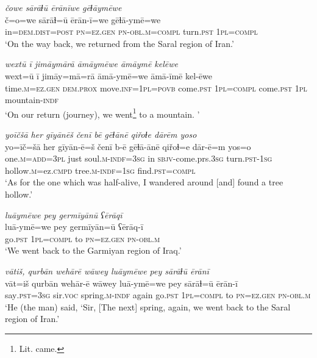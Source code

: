 \ea \label{ZQ.10}
\textit{čowe sārāɫū ērānīwe gēɫāymēwe} \\ 
\gll č=o=we sārāɫ=ū ērān-ī=we gēɫā-ymē=we \\ 
 in=\textsc{dem.dist}\textsc{=\textsc{post}} \textsc{pn}\textsc{=ez.gen} \textsc{pn}\textsc{-obl}\textsc{.m}\textsc{=compl} turn\textsc{.pst} \textsc{1pl}\textsc{=compl} \\ 
\glt `On the way back, we returned from the Saral region of Iran.'
\z 
 
\ea \label{ZQ.11}
\textit{wextū ī jimāymārā āmāymēwe āmāymē kelēwe} \\ 
\gll wext=ū ī jimāy=mā=rā āmā-ymē=we āmā-īmē kel-ēwe \\ 
 time\textsc{.m}\textsc{=ez.gen} \textsc{dem.prox} move\textsc{.inf}\textsc{=\textsc{1pl}}\textsc{=\textsc{povb}} come\textsc{.pst} \textsc{1pl}\textsc{=compl} come\textsc{.pst} \textsc{1pl} mountain\textsc{-indf} \\ 
\glt `On our return (journey), we went\footnote{Lit. came.}  to a mountain. '
\z 
 
\ea \label{ZQ.23}
\textit{yoīčšā her gīyānēš čenī bē gēɫānē qiřoɫe dārēm yoso} \\ 
\gll yo=īč=šā her gīyān-ē=š čenī b-ē gēɫā-ānē qiřoɫ=e dār-ē=m yos=o \\ 
 one\textsc{.m}\textsc{=add}\textsc{=3pl} just soul\textsc{.m}\textsc{-indf}\textsc{=3sg} in \textsc{sbjv-}come.prs\textsc{.3sg} turn\textsc{.pst}\textsc{-\textsc{1sg}} hollow\textsc{.m}=ez\textsc{.cmpd} tree\textsc{.m}\textsc{-indf}\textsc{=\textsc{1sg}} find\textsc{.pst}\textsc{=compl} \\ 
\glt `As for the one which was half-alive, I wandered around [and] found a tree hollow.'
\z 
 
\ea \label{ZQ.27}
\textit{luāymēwe pey germīyānū ʕērāqī} \\ 
\gll luā-ymē=we pey germīyān=ū ʕērāq-ī \\ 
 go\textsc{.pst} \textsc{1pl}\textsc{=compl} to \textsc{pn}\textsc{=ez.gen} \textsc{pn}\textsc{-obl}\textsc{.m} \\ 
\glt `We went back to the Garmiyan region of Iraq.'
\z 
 
\ea \label{ZQ.33}
\textit{vātiš, qurbān wehārē wāwey luāymēwe pey sārāɫū ērānī} \\ 
\gll vāt=iš qurbān wehār-ē wāwey luā-ymē=we pey sārāɫ=ū ērān-ī \\ 
 say\textsc{.pst}\textsc{=3sg} sir.\textsc{voc} spring\textsc{.m}\textsc{-indf} again go\textsc{.pst} \textsc{1pl}\textsc{=compl} to \textsc{pn}\textsc{=ez.gen} \textsc{pn}\textsc{-obl}\textsc{.m} \\ 
\glt `He (the man) said, ‘Sir, [The next] spring, again, we went back to the Saral region of Iran.'
\z 
 
